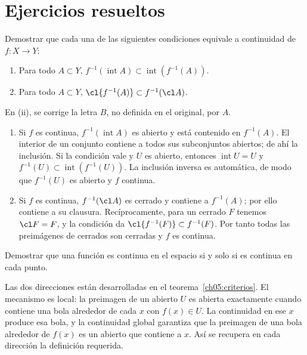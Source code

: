 \section{Ejercicios resueltos}
\begin{ejercicio}
Demostrar que cada una de las siguientes condiciones equivale a continuidad de $f:X\to Y$:
\begin{enumerate}[label=(\roman*)]
\item Para todo $A\subset Y$, $f^{-1}(\operatorname{int}A)\subset\operatorname{int}(f^{-1}(A))$.
\item Para todo $A\subset Y$, $\cl{f^{-1}(A)}\subset f^{-1}(\cl A)$.
\end{enumerate}
En (ii), se corrige la letra $B$, no definida en el original, por $A$.
\end{ejercicio}
\begin{solucion}
\begin{enumerate}[label=(\roman*)]
\item Si $f$ es continua, $f^{-1}(\operatorname{int}A)$ es abierto y está contenido en $f^{-1}(A)$. El interior de un conjunto contiene a todos sus subconjuntos abiertos; de ahí la inclusión. Si la condición vale y $U$ es abierto, entonces $\operatorname{int}U=U$ y $f^{-1}(U)\subset\operatorname{int}(f^{-1}(U))$. La inclusión inversa es automática, de modo que $f^{-1}(U)$ es abierto y $f$ continua.
\item Si $f$ es continua, $f^{-1}(\cl A)$ es cerrado y contiene a $f^{-1}(A)$; por ello contiene a su clausura. Recíprocamente, para un cerrado $F$ tenemos $\cl F=F$, y la condición da $\cl{f^{-1}(F)}\subset f^{-1}(F)$. Por tanto todas las preimágenes de cerrados son cerradas y $f$ es continua.
\end{enumerate}
\end{solucion}

\begin{ejercicio}
Demostrar que una función es continua en el espacio si y solo si es continua en cada punto.
\end{ejercicio}
\begin{solucion}
Las dos direcciones están desarrolladas en el teorema~\ref{ch05:criterios}. El mecanismo es local: la preimagen de un abierto $U$ es abierta exactamente cuando contiene una bola alrededor de cada $x$ con $f(x)\in U$. La continuidad en ese $x$ produce esa bola, y la continuidad global garantiza que la preimagen de una bola alrededor de $f(x)$ es un abierto que contiene a $x$. Así se recupera en cada dirección la definición requerida.
\end{solucion}

